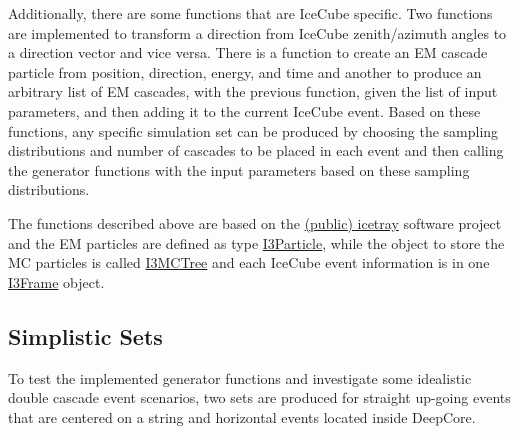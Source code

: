 Additionally, there are some functions that are IceCube specific. Two functions are implemented to transform a direction from IceCube zenith/azimuth angles to a direction vector and vice versa. There is a function to create an EM cascade particle from position, direction, energy, and time and another to produce an arbitrary list of EM cascades, with the previous function, given the list of input parameters, and then adding it to the current IceCube event. Based on these functions, any specific simulation set can be produced by choosing the sampling distributions and number of cascades to be placed in each event and then calling the generator functions with the input parameters based on these sampling distributions.
\begin{kaobox}[frametitle=IceCube software framework]
    The functions described above are based on the \href{https://github.com/icecube/icetray-public}{(public) icetray} software project and the EM particles are defined as type \href{https://docs.icecube.aq/icetray/main/projects/dataclasses/particle.html#i3particle}{I3Particle}, while the object to store the MC particles is called \href{https://docs.icecube.aq/icetray/main/projects/dataclasses/i3mctree.html#i3mctree}{I3MCTree} and each IceCube event information is in one \href{https://docs.icecube.aq/icetray/main/projects/icetray/classes/i3frame.html#index-0}{I3Frame} object.
\end{kaobox}


\subsection{Simplistic Sets}

To test the implemented generator functions and investigate some idealistic double cascade event scenarios, two sets are produced for straight up-going events that are centered on a string and horizontal events located inside DeepCore.

